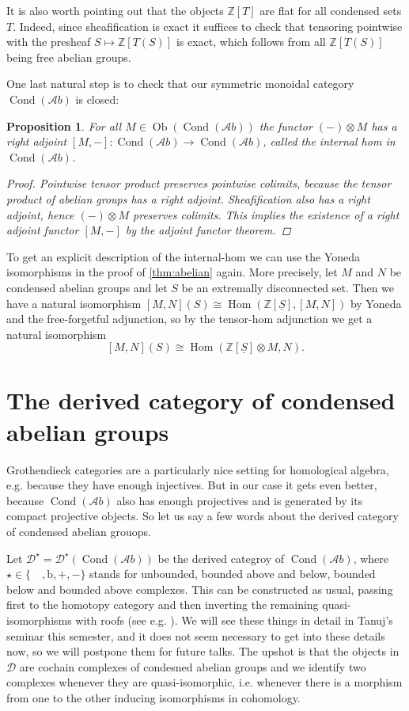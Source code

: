 \documentclass[11pt,A4]{article}
\theoremstyle{plain}
\newtheorem{prop}[thm]{Proposition}
\theoremstyle{definition}
\theoremstyle{remark}
\newcommand{\Z}{\mathbb{Z}}
\newcommand{\1}{\mathbbm{1}}
\newcommand{\Ab}{\mathscr{A}b}
\newcommand{\D}{\mathscr{D}}
\DeclareMathOperator{\Hom}{Hom}
\DeclareMathOperator{\Cond}{Cond}
\DeclareMathOperator{\Ob}{Ob}
\renewcommand{\u}[1]{\underline{#1}}
\newcommand{\ot}{\otimes}
\begin{document}
It is also worth pointing out that the objects $\Z[T]$ are flat for all condensed sets $T$.
Indeed, since sheafification is exact it suffices to check that tensoring pointwise with the presheaf $S\mapsto \Z[T(S)]$ is exact, which follows from all $\Z[T(S)]$ being free abelian groups.

One last natural step is to check that our symmetric monoidal category $\Cond(\Ab)$ is closed:

\begin{prop}
    For all $M\in \Ob(\Cond(\Ab))$ the functor $(-)\ot M$ has a right adjoint $[M,-]\colon \Cond(\Ab)\to \Cond(\Ab)$, called the \textit{internal hom} in $\Cond(\Ab)$.
    \begin{proof}
	Pointwise tensor product preserves pointwise colimits, because the tensor product of abelian groups has a right adjoint.
	Sheafification also has a right adjoint, hence $(-)\ot M$ preserves colimits.
	This implies the existence of a right adjoint functor $[M,-]$ by the adjoint functor theorem.
    \end{proof}
\end{prop}

To get an explicit description of the internal-hom we can use the Yoneda isomorphisms in the proof of \cref{thm:abelian} again.
More precisely, let $M$ and $N$ be condensed abelian groups and let $S$ be an extremally disconnected set.
Then we have a natural isomorphism $[M,N](S)\cong \Hom(\Z[\u{S}],[M,N])$ by Yoneda and the free-forgetful adjunction, so by the tensor-hom adjunction we get a natural isomorphism
\[ [M,N](S)\cong \Hom(\Z[\u{S}]\ot M,N).\]

\section{The derived category of condensed abelian groups}

Grothendieck categories are a particularly nice setting for homological algebra, e.g. because they have enough injectives.
But in our case it gets even better, because $\Cond(\Ab)$ also has enough projectives and is generated by its compact projective objects.
So let us say a few words about the derived category of condensed abelian grouops.

Let $\D^{\star}=\D^{\star}(\Cond(\Ab))$ be the derived categroy of $\Cond(\Ab)$, where $\star\in \{\quad,\mathrm{b},+,-\}$ stands for unbounded, bounded above and below, bounded below and bounded above complexes.
This can be constructed as usual, passing first to the homotopy category and then inverting the remaining quasi-isomorphisms with roofs (see e.g. \cite{gm03}).
We will see these things in detail in Tanuj's seminar this semester, and it does not seem necessary to get into these details now, so we will postpone them for future talks.
The upshot is that the objects in $\D$ are cochain complexes of condesned abelian groups and we identify two complexes whenever they are quasi-isomorphic, i.e. whenever there is a morphism from one to the other inducing isomorphisms in cohomology.
\end{document}
